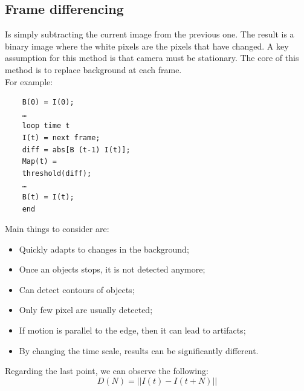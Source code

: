\subsection{Frame differencing}
Is simply subtracting the current image from the previous one. The result is a binary image where the white pixels are the pixels that have changed. A key assumption for this method is that camera must be stationary. The core of this method is to replace background at each frame.
\\For example:
\begin{verbatim}
    B(0) = I(0);
    …
    loop time t
    I(t) = next frame;
    diff = abs[B (t-1) I(t)];
    Map(t) =
    threshold(diff);
    …
    B(t) = I(t);
    end
\end{verbatim} 
Main things to consider are:
\begin{itemize}
    \item Quickly adapts to changes in the background;
    \item Once an objects stops, it is not detected anymore;
    \item Can detect contours of objects;
    \item Only few pixel are usually detected;
    \item If motion is parallel to the edge, then it can lead to artifacts;
    \item By changing the time scale, results can be significantly different.
\end{itemize}
Regarding the last point, we can observe the following:
\[D(N) = ||I(t)-I(t+N)||\]
